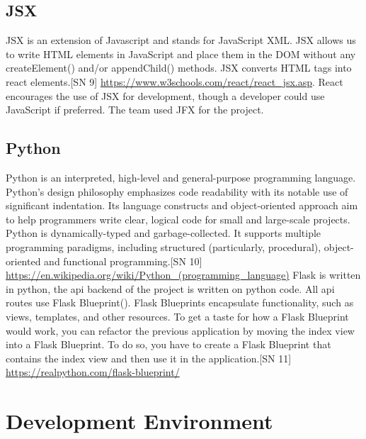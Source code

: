 \subsection{JSX}
JSX is an extension of Javascript and stands for JavaScript XML.
JSX allows us to write HTML elements in JavaScript and place them in the DOM without any createElement()  and/or appendChild() methods. JSX converts HTML tags into react elements.[SN 9] \url{https://www.w3schools.com/react/react_jsx.asp}.
React encourages the use of JSX for development, though a developer could use JavaScript if preferred.
The team used JFX for the project.

\subsection{Python}
Python is an interpreted, high-level and general-purpose programming language. Python's design philosophy emphasizes code readability with its notable use of significant indentation. Its language constructs and object-oriented approach aim to help programmers write clear, logical code for small and large-scale projects.
Python is dynamically-typed and garbage-collected. It supports multiple programming paradigms, including structured (particularly, procedural), object-oriented and functional programming.[SN 10] \url{https://en.wikipedia.org/wiki/Python_(programming_language)}
Flask is written in python, the api backend of the project is written on python code. All api routes use Flask Blueprint().
Flask Blueprints encapsulate functionality, such as views, templates, and other resources. To get a taste for how a Flask Blueprint would work, you can refactor the previous application by moving the index view into a Flask Blueprint. To do so, you have to create a Flask Blueprint that contains the index view and then use it in the application.[SN 11] \url{https://realpython.com/flask-blueprint/}

\section{Development Environment}
